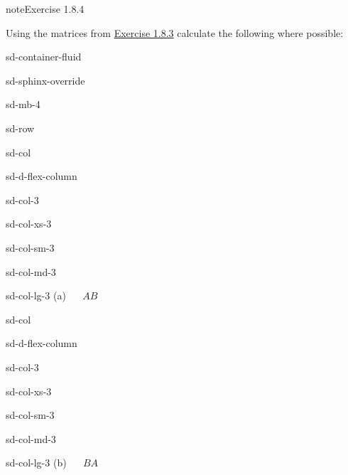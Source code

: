 \documentclass[letterpaper,10pt,english]{jupyterBook}
\begin{document}
\begin{sphinxadmonition}{note}{Exercise 1.8.4}



\sphinxAtStartPar
Using the matrices from \hyperref[exercise:matrices-ex2]{Exercise 1.8.3} calculate the following where possible:

\begin{sphinxuseclass}{sd-container-fluid}
\begin{sphinxuseclass}{sd-sphinx-override}
\begin{sphinxuseclass}{sd-mb-4}
\begin{sphinxuseclass}{sd-row}
\begin{sphinxuseclass}{sd-col}
\begin{sphinxuseclass}{sd-d-flex-column}
\begin{sphinxuseclass}{sd-col-3}
\begin{sphinxuseclass}{sd-col-xs-3}
\begin{sphinxuseclass}{sd-col-sm-3}
\begin{sphinxuseclass}{sd-col-md-3}
\begin{sphinxuseclass}{sd-col-lg-3}
\sphinxAtStartPar
(a)    \(AB\)

\end{sphinxuseclass}
\end{sphinxuseclass}
\end{sphinxuseclass}
\end{sphinxuseclass}
\end{sphinxuseclass}
\end{sphinxuseclass}
\end{sphinxuseclass}
\begin{sphinxuseclass}{sd-col}
\begin{sphinxuseclass}{sd-d-flex-column}
\begin{sphinxuseclass}{sd-col-3}
\begin{sphinxuseclass}{sd-col-xs-3}
\begin{sphinxuseclass}{sd-col-sm-3}
\begin{sphinxuseclass}{sd-col-md-3}
\begin{sphinxuseclass}{sd-col-lg-3}
\sphinxAtStartPar
(b)    \(BA\)


\end{sphinxuseclass}
\end{sphinxuseclass}
\end{sphinxuseclass}
\end{sphinxuseclass}
\end{sphinxuseclass}
\end{sphinxuseclass}
\end{sphinxuseclass}
\end{sphinxuseclass}
\end{sphinxuseclass}
\end{sphinxuseclass}
\end{sphinxuseclass}
\end{sphinxadmonition}
\end{document}

